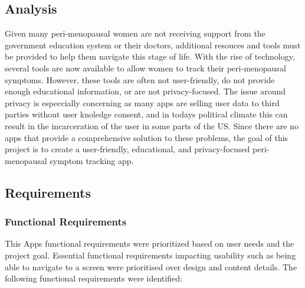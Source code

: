 \subsection{Analysis}
Given many peri-menopausal women are not receiving support from the government education system or their doctors, additional resouces and tools must be provided to help them navigate this stage of life. With the rise of technology, several tools are now available to allow women to track their peri-menopausal symptoms. However, these tools are often not user-friendly, do not provide enough educational information, or are not privacy-focused. The issue around privacy is especcially concerning as many apps are selling user data to third parties without user knoledge consent, and in todays political climate this can result in the incarceration of the user in some parts of the US. Since there are no apps that provide a comprehensive solution to these problems, the goal of this project is to create a user-friendly, educational, and privacy-focused peri-menopausal symptom tracking app.

\subsection{Requirements}

\subsubsection{Functional Requirements}
This Apps functional requirements were prioritized based on user needs and the project goal. Essential functional requirements impacting usability such as being able to navigate to a screen were prioritised over design and content details. The following functional requirements were identified:

